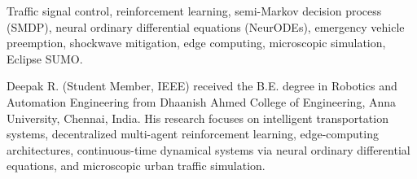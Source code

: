 \documentclass[journal]{IEEEtran}
\begin{document}
\begin{IEEEkeywords}
Traffic signal control, reinforcement learning, semi-Markov decision process (SMDP), neural ordinary differential equations (NeurODEs), emergency vehicle preemption, shockwave mitigation, edge computing, microscopic simulation, Eclipse SUMO.
\end{IEEEkeywords}










\begin{IEEEbiographynophoto}{Deepak R.}
(Student Member, IEEE) received the B.E. degree in Robotics and Automation Engineering from Dhaanish Ahmed College of Engineering, Anna University, Chennai, India. His research focuses on intelligent transportation systems, decentralized multi-agent reinforcement learning, edge-computing architectures, continuous-time dynamical systems via neural ordinary differential equations, and microscopic urban traffic simulation.
\end{IEEEbiographynophoto}
\end{document}
